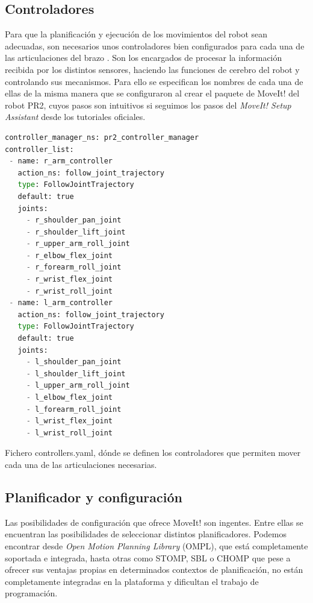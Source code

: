 \documentclass[12pt,spanish,chapterprefix, numbers=noenddot]{book}
\numberwithin{equation}{section}
\numberwithin{figure}{section}
\begin{document}
\subsection{Controladores}
Para que la planificación y ejecución de los movimientos del robot sean adecuadas, son necesarios unos controladores bien configurados para cada una de las articulaciones del brazo \cite{pr2_controllers}. Son los encargados de procesar la información recibida por los distintos sensores, haciendo las funciones de cerebro del robot y controlando sus mecanismos.
Para ello se especifican los nombres de cada una de ellas de la misma manera que se configuraron al crear el paquete de MoveIt! del robot PR2, cuyos pasos son intuitivos si seguimos los pasos del \textit{MoveIt! Setup Assistant} desde los tutoriales oficiales. \cite{moveit_tutorials}
\vspace{20pt}
\begin{algorithm}[htb!]
	\begin{lstlisting}[breaklines=true,language=python] 
controller_manager_ns: pr2_controller_manager
controller_list:
 - name: r_arm_controller
   action_ns: follow_joint_trajectory
   type: FollowJointTrajectory
   default: true
   joints:
     - r_shoulder_pan_joint
     - r_shoulder_lift_joint
     - r_upper_arm_roll_joint
     - r_elbow_flex_joint
     - r_forearm_roll_joint
     - r_wrist_flex_joint
     - r_wrist_roll_joint
 - name: l_arm_controller
   action_ns: follow_joint_trajectory
   type: FollowJointTrajectory
   default: true
   joints:
     - l_shoulder_pan_joint
     - l_shoulder_lift_joint
     - l_upper_arm_roll_joint
     - l_elbow_flex_joint
     - l_forearm_roll_joint
     - l_wrist_flex_joint
     - l_wrist_roll_joint
	\end{lstlisting}
\caption{\label{alg:pr2_controllers}Fichero controllers.yaml, dónde se definen los controladores que permiten mover cada una de las articulaciones necesarias.}
\end{algorithm}
\subsection{Planificador y configuración}
Las posibilidades de configuración que ofrece MoveIt! son ingentes. Entre ellas se encuentran las posibilidades de seleccionar distintos planificadores. Podemos encontrar desde \textit{Open Motion Planning Library} (OMPL), que está completamente soportada e integrada, hasta otras como STOMP, SBL o CHOMP que pese a ofrecer sus ventajas propias en determinados contextos de planificación, no están completamente integradas en la plataforma y dificultan el trabajo de programación. 
\end{document}
